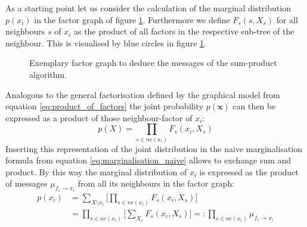 \documentclass{sigkdd}
\begin{document}
As a starting point let us consider the calculation of the marginal distribution $p(x_i)$ in the factor graph of figure \ref{fig:message1}. Furthermore we define $F_s(s, X_s)$ for all neighbours $s$ of $x_i$ as the product of all factors in the respective sub-tree of the neighbour. This is visualised by blue circles in figure \ref{fig:message1}.
\begin{figure}[h]
	\centering
	\caption{Exemplary factor graph to deduce the messages of the sum-product algorithm.}\label{fig:message1}
\end{figure}

Analogous to the general factorisation defined by the graphical model from equation \ref{eq:product_of_factors} the joint probability $p(\mathbf{x})$ can then be expressed as a product of those neighbour-factor of $x_i$:
\begin{equation}\label{eq:product_of_neighbours}
p(X)= \prod_{s \in ne(x_i)} F_s(x_i, X_s)
\end{equation}
Inserting this representation of the joint distribution in the naive marginalisation formula from equation \ref{eq:marginalisation_naive} allows to exchange sum and product. By this way the marginal distribution of $x_i$ is expressed as the product of messages $\mu_{f_s \rightarrow x_i}$ from all its neighbours in the factor graph:
\begin{equation}\label{eq:message1}
\begin{split}
p(x_i) &= \sum_{X \setminus x_i} \Big[ \prod_{s \in ne(x_i)} F_s(x_i, X_s) \Big] \\ &= \prod_{s \in ne(x_i)} \Big[ \sum_{X_s} F_s(x_i, X_s)\Big] =: \prod_{s \in ne(x_i)} \mu_{f_s \rightarrow x_i}
\end{split}
\end{equation}
\end{document}
